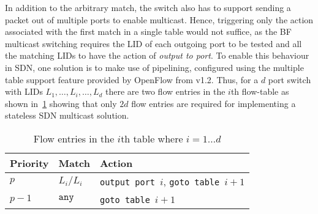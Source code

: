 \documentclass[conference]{IEEEtran}
\newcommand{\secref}[1]{\ref{#1}}
\begin{document}
In addition to the arbitrary match, the switch also has to support sending a packet out of multiple ports to enable multicast. Hence, triggering only the action associated with the first match in a single table would not suffice, as the BF multicast switching requires the LID of each outgoing port to be tested and all the matching LIDs to have the action of \emph{output to port}. To enable this behaviour in SDN, one solution is to make use of pipelining, configured using the multiple table support feature provided by OpenFlow from v1.2. Thus, for a $d$ port switch with LIDs $L_1,\ldots,L_i,\ldots,L_d$ there are two flow entries in the $i$th flow-table as shown in~\secref{tab:tables} showing that only $2d$ flow entries are required for implementing a stateless SDN multicast solution. 
\begin{table}[tb]
  \centering
  \caption{Flow entries in the $i$th table where $i=1\ldots d$}
  \label{tab:tables}
  \vspace{0.5em}
  \begin{tabular}{|l|l|l|}
    \hline
    Priority & Match & Action\\
    \hline
    $p$ & $L_i/L_i$ & \texttt{output port}~$i$, \texttt{goto table}~$i+1$ \\
    \hline
    $p-1$ & $\texttt{any}$ &\texttt{goto table}~$i+1$ \\
    \hline
  \end{tabular}
\end{table}
\end{document}
